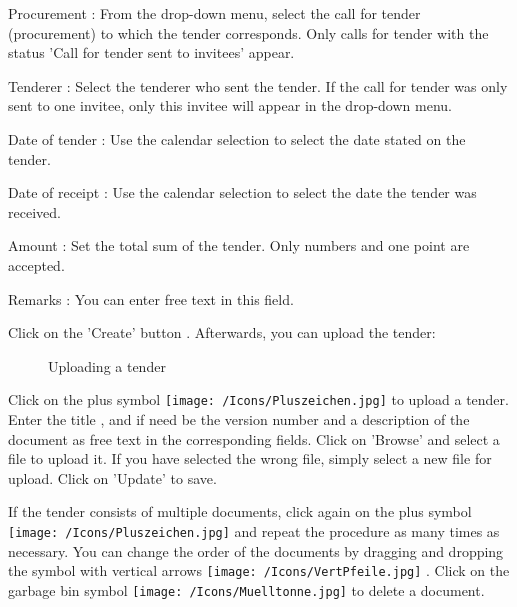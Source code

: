 \vspace{\baselineskip}

\begin{compactitem}
\item
Procurement : From the drop-down menu, select the call for tender (procurement) to which the tender corresponds. Only calls for tender with the status 'Call for tender sent to invitees' appear.
\item
Tenderer : Select the tenderer who sent the tender. If the call for tender was only sent to one invitee, only this invitee will appear in the drop-down menu.
\item
Date of tender : Use the calendar selection to select the date stated on the tender.
\item
Date of receipt : Use the calendar selection to select the date the tender was received.
\item
Amount : Set the total sum of the tender. Only numbers and one point are accepted.
\item
Remarks : You can enter free text in this field.
\end{compactitem}

\vspace{\baselineskip}

Click on the 'Create' button . Afterwards, you can upload the 
tender:

\begin{figure}[H]
\caption{Uploading a tender}
\end{figure}

Click on the plus symbol \texttt{[image: /Icons/Pluszeichen.jpg]}  to upload a tender. Enter the title , and if need be the version number  and a description of the document  as free text in the corresponding fields. Click on 'Browse'  and select a file to upload it. If you have selected the wrong file, simply select a new file for upload. Click on 'Update'  to save.

\vspace{\baselineskip}

If the tender consists of multiple documents, click again on the plus symbol \texttt{[image: /Icons/Pluszeichen.jpg]}  and repeat the procedure as many times as necessary. You can change the order of the documents by dragging and dropping the symbol with vertical arrows \texttt{[image: /Icons/VertPfeile.jpg]} . Click on the garbage bin symbol \texttt{[image: /Icons/Muelltonne.jpg]}  to delete a document.


